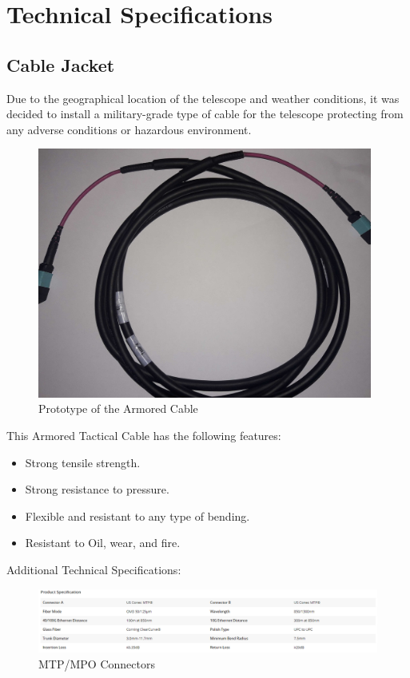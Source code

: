 \newpage
\section{Technical Specifications}

\subsection{Cable Jacket}

  Due to the geographical location of the telescope and weather conditions, it was decided to install a military-grade type of cable for the telescope protecting from any adverse conditions or hazardous environment. 

\begin{figure}
  \includegraphics[width=11cm]{images/mtp_militar_cable.jpg}
  \centering
  \caption{Prototype of the Armored Cable}
  \label{fig:jlsimon}
\end{figure}

This Armored Tactical Cable has the following features:

\begin{itemize}
  \item Strong tensile strength.
  \item Strong resistance to pressure.
  \item Flexible and resistant to any type of bending.
  \item Resistant to Oil, wear, and fire.
\end{itemize}

\newpage
Additional Technical Specifications:

\begin{figure}
  \includegraphics[width=\textwidth]{images/2.png}
  \caption{MTP/MPO Connectors}
  \label{fig:jlsimon}
\end{figure}


